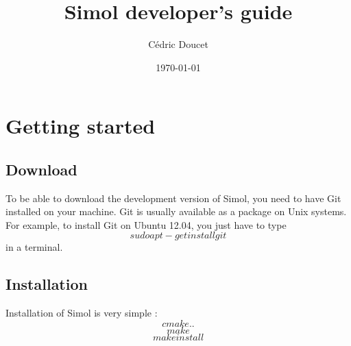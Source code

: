 \documentclass[12pt]{book}
\title{Simol developer's guide}
\author{C\'edric Doucet}
\date{\today}
\begin{document}
\maketitle
\tableofcontents



\chapter{Getting started}

\section{Download}

To be able to download the development version of Simol, you need to have Git installed on your machine. Git is usually available as a package on Unix systems. For example, to install Git on Ubuntu 12.04, you just have to type
$$sudo apt-get install git$$
in a terminal.

\section{Installation}

Installation of Simol is very simple :
$$cmake ..$$
$$make$$
$$make install$$
\end{document}
